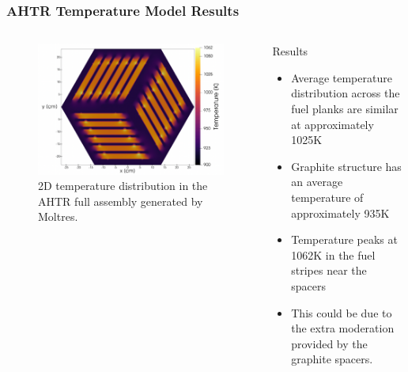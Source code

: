\begin{frame}
    \frametitle{AHTR Temperature Model Results}
    \begin{columns}
        \begin{column}{0.6\textwidth}
            \begin{figure}[]
                \centering
                \includegraphics[width=\linewidth]{../docs/figures/benchmark-temperature-model.png} 
                \caption{2D temperature distribution in the \acrfull{AHTR}
                full assembly generated by Moltres.}
            \end{figure}
        \end{column}
        \begin{column}{0.4\textwidth} 
            \begin{block}{Results}
                \begin{itemize}
                    \item Average temperature distribution across the fuel planks are 
                    similar at approximately 1025K
                    \item Graphite structure has an average temperature of approximately 
                    935K
                    \item Temperature peaks at 1062K in the fuel stripes near the spacers
                    \item This could be due to the extra moderation provided by the
                    graphite spacers.
                \end{itemize}
            \end{block}
        \end{column}
        \end{columns}

\end{frame}